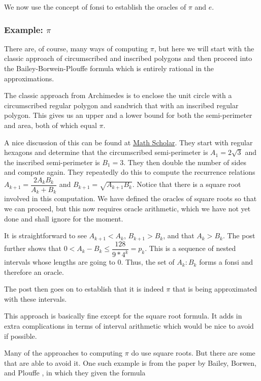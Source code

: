 \documentclass[12pt]{article}
\theoremstyle{remark}
\begin{document}
We now use the concept of fonsi to establish the oracles of $\pi$ and $e$.

\subsubsection{Example: $\pi$}

There are, of course, many ways of computing $\pi$, but here we will start with the classic approach of circumscribed and inscribed polygons and then proceed into the Bailey-Borwein-Plouffe formula which is entirely rational in the approximations. 

The classic approach from Archimedes is to enclose the unit circle with a circumscribed regular polygon and sandwich that with an inscribed regular polygon. This gives us an upper and a lower bound for both the semi-perimeter and area, both of which equal $\pi$. 

A nice discussion of this can be found at \href{https://mathscholar.org/2019/02/simple-proofs-archimedes-calculation-of-pi/}{Math Scholar}. They start with regular hexagons and determine that the circumscribed semi-perimeter is $A_1 = 2 \sqrt{3}$ and the inscribed semi-perimeter is $B_1 = 3$. They then double the number of sides and compute again. They repeatedly do this to compute the recurrence relations $A_{k+1} = \dfrac{2A_k B_k}{A_k + B_k}$ and $B_{k+1} = \sqrt{A_{k+1}B_k}$. Notice that there is a square root involved in this computation. We have defined the oracles of square roots so that we can proceed, but this now requires oracle arithmetic, which we have not yet done and shall ignore for the moment.  

It is straightforward to see $A_{k+1} < A_k$, $B_{k+1} > B_k$, and that $A_k > B_k$. The post further shows that $0 < A_k - B_k \leq \dfrac{128}{9*4^k} = p_k $. This is a sequence of nested intervals whose lengths are going to 0. Thus, the set of $A_k:B_k$ forms a fonsi and therefore an oracle. 

The post then goes on to establish that it is indeed $\pi$ that is being approximated with these intervals.

This approach is basically fine except for the square root formula. It adds in extra complications in terms of interval arithmetic which would be nice to avoid if possible. 

Many of the approaches to computing $\pi$ do use square roots. But there are some that are able to avoid it. One such example is from the paper by Bailey, Borwen, and Plouffe \cite{BBP}, in which they given the formula 
\end{document}
